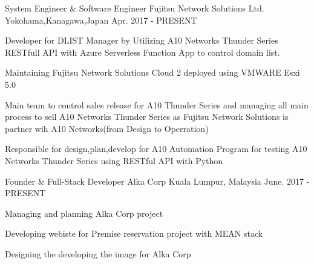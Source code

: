 

\begin{cventries}

  \cventry
	{System Engineer \& Software Engineer} %
    {Fujitsu Network Solutions Ltd. } %
    {Yokohama,Kanagawa,Japan} %
    {Apr. 2017 - PRESENT} %
    {
      \begin{cvitems} %
        \item {Developer for DLIST Manager by Utilizing A10 Networks Thunder Series RESTfull API with Azure Serverless Function App to control domain list.}
        \item {Maintaining Fujitsu Network Solutions Cloud 2 deployed using VMWARE Esxi 5.0 }
        \item {Main team to control sales release for A10 Thunder Series and managing all main process to sell  A10 Networks Thunder Series as Fujitsu Network Solutions is partner wih A10 Networks(from Design to Operration)}
        \item{Responsible for design,plan,develop for A10 Automation Program for testing A10 Networks Thunder Series using RESTful API with Python}
      \end{cvitems}
    }

  \cventry
	{Founder \& Full-Stack Developer } %
    {Alka Corp} %
    {Kuala Lumpur, Malaysia} %
    {June. 2017 - PRESENT} %
    {
      \begin{cvitems} %
        \item {Managing and planning Alka Corp project }
        \item {Developing webiste for Premise reservation project with MEAN stack}
        \item {Designing the developing the image for Alka Corp }
      \end{cvitems}
    }


\end{cventries}
